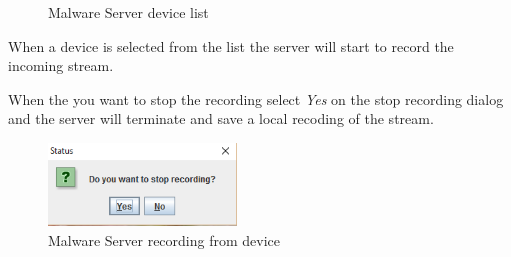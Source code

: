 \documentclass[a4paper,12pt,titlepage]{article}
\begin{document}
\begin{enumerate}
{\begin{figure}[H]
\caption{Malware Server device list}
\label{fig:my_label9}
\end{figure}
\item When a device is selected from the list the server will start to record the incoming stream. 
\item When the you want to stop the recording select \textit{Yes} on the stop recording dialog and the server will terminate and save a local recoding of the stream.
\begin{figure}[H]
\center
\includegraphics[width=5cm]{MalwareScreenshots/stopRec}
\caption{Malware Server recording from device}
\label{fig:my_label10}
\end{figure}}
\end{enumerate}
\end{document}
